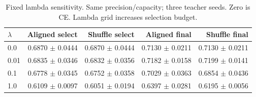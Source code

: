 \begin{table}[H]\centering\small
\caption{Fixed lambda sensitivity. Same precision/capacity; three teacher seeds. Zero is CE. Lambda grid increases selection budget.}
\begin{tabular}{lrrrr}\toprule
$\lambda$ & Aligned select & Shuffle select & Aligned final & Shuffle final\\\midrule
0.0 & 0.6870 $\pm$ 0.0444 & 0.6870 $\pm$ 0.0444 & 0.7130 $\pm$ 0.0211 & 0.7130 $\pm$ 0.0211\\
0.01 & 0.6835 $\pm$ 0.0346 & 0.6832 $\pm$ 0.0356 & 0.7182 $\pm$ 0.0158 & 0.7199 $\pm$ 0.0141\\
0.1 & 0.6778 $\pm$ 0.0345 & 0.6752 $\pm$ 0.0358 & 0.7029 $\pm$ 0.0363 & 0.6854 $\pm$ 0.0436\\
1.0 & 0.6109 $\pm$ 0.0097 & 0.6051 $\pm$ 0.0194 & 0.6397 $\pm$ 0.0281 & 0.6195 $\pm$ 0.0056\\
\bottomrule\end{tabular}\end{table}
